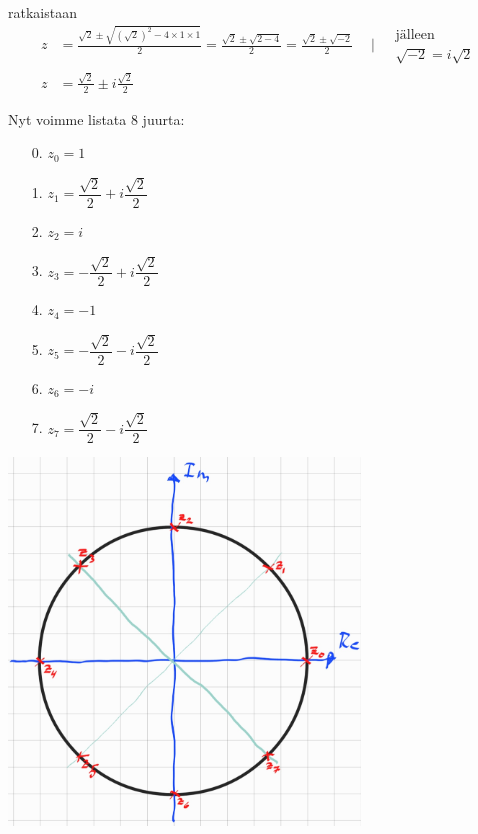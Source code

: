 \documentclass{article}
\begin{document}
\begin{itemize}
\begin{itemize}
        ratkaistaan
        \[
            \begin{aligned}
                z &= \frac{\sqrt{2} \pm \sqrt{ (\sqrt{2})^2 - 4 \times 1 \times 1 }}{2} = \frac{\sqrt{2} \pm \sqrt{2 - 4}}{2} = \frac{\sqrt{2} \pm \sqrt{-2}}{2} \quad \mid
                \begin{aligned}
                    &\text{jälleen} \\
                    &\sqrt{-2} = i\sqrt{2}
                \end{aligned} \\
            z &= \frac{\sqrt{2}}{2} \pm i\frac{\sqrt{2}}{2}
        \end{aligned}
    \]
    \end{itemize}
    Nyt voimme listata 8 juurta:
    \begin{itemize}
        \item [0.] \( z_0 = 1 \)
        \item [1.] \( z_1 = \dfrac{\sqrt{2}}{2} + i\dfrac{\sqrt{2}}{2} \)
        \item [2.] \( z_2 = i \)
        \item [3.] \( z_3 = -\dfrac{\sqrt{2}}{2} + i\dfrac{\sqrt{2}}{2} \)
        \item [4.] \( z_4 = -1 \)
        \item [5.] \( z_5 = -\dfrac{\sqrt{2}}{2} - i\dfrac{\sqrt{2}}{2} \)
        \item [6.] \( z_6 = -i \)
        \item [7.] \( z_7 = \dfrac{\sqrt{2}}{2} - i\dfrac{\sqrt{2}}{2} \)
    \end{itemize}
    \begin{center}
        \includegraphics[width=0.7\textwidth]{harj6teht5a.jpg}
    \end{center}
    

\end{itemize}
\end{document}

